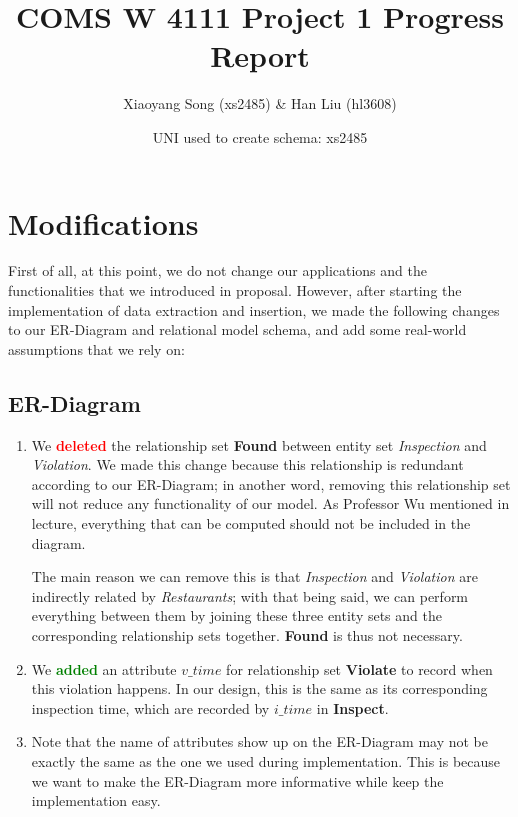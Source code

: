 \documentclass[a4paper,12pt]{article}
\title{COMS W 4111 Project 1 Progress Report}
\author{Xiaoyang Song (xs2485) \& Han Liu (hl3608)}
\date{UNI used to create schema: xs2485}
\theoremstyle{definition}
\begin{document}
\maketitle
\section{Modifications}
First of all, at this point, we do not change our applications and the functionalities that we introduced in proposal. However, after starting the implementation of data extraction and insertion, we made the following changes to our ER-Diagram and relational model schema, and add some real-world assumptions that we rely on:
\subsection{ER-Diagram}
\begin{enumerate}
    \item We \textcolor{Red}{\textbf{deleted}} the relationship set \textbf{Found} between entity set \textit{Inspection} and \textit{Violation}. We made this change because this relationship is redundant according to our ER-Diagram; in another word, removing this relationship set will not reduce any functionality of our model. As Professor Wu mentioned in lecture, everything that can be computed should not be included in the diagram. 
    
    The main reason we can remove this is that \textit{Inspection} and \textit{Violation} are indirectly related by \textit{Restaurants}; with that being said, we can perform everything between them by joining these three entity sets and the corresponding relationship sets together. \textbf{Found} is thus not necessary.
    \item We \textcolor{Green}{\textbf{added}} an attribute $v\_time$ for relationship set \textbf{Violate} to record when this violation happens. In our design, this is the same as its corresponding inspection time, which are recorded by $i\_time$ in \textbf{Inspect}. 
    \item Note that the name of attributes show up on the ER-Diagram may not be exactly the same as the one we used during implementation. This is because we want to make the ER-Diagram more informative while keep the implementation easy.
\end{enumerate}
\end{document}
